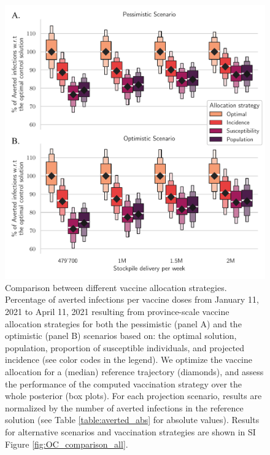 \begin{figure}[!ht]
    \centering
    \includegraphics[width=\textwidth]{fig_italy-ocp/figures/scenarios_perturb_all.pdf}
    \caption[Comparison between different vaccine allocation strategies]{Comparison between different vaccine allocation strategies. Percentage of averted infections per vaccine doses from January 11, 2021 to April 11, 2021 resulting from province-scale vaccine allocation strategies for both the pessimistic (panel A) and the optimistic (panel B) scenarios based on: the optimal solution, population, proportion of susceptible individuals, and projected incidence (see color codes in the legend). We optimize the vaccine allocation for a (median) reference trajectory (diamonds), and assess the performance of the computed vaccination strategy over the whole posterior (box plots). For each projection scenario, results are normalized by the number of averted infections in the reference solution (see Table \ref{table:averted_abs} for absolute values). Results for alternative scenarios and vaccination strategies are shown in SI Figure \ref{fig:OC_comparison_all}.}
    \label{fig:OC_comparison}
\end{figure}
